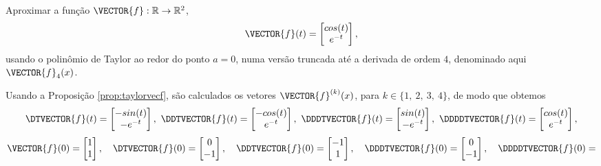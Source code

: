 \begin{example}\label{ex:prop:taylorvecf}
Aproximar a função $\VECTOR{f}:\mathbb{R} \rightarrow \mathbb{R}^{2}$,
\begin{equation}
\VECTOR{f}(t)=
\begin{bmatrix}
cos(t)\\
e^{-t}
\end{bmatrix},
\end{equation}
usando o polinômio de Taylor ao redor do ponto $a=0$,
numa versão truncada até a derivada de ordem $4$,
denominado aqui $\VECTOR{f}_4(x)$.
\end{example}
\begin{SolutionT}
Usando a Proposição \ref{prop:taylorvecf}, são calculados os vetores $\VECTOR{f}^{(k)}(x)$, para $k\in\{1,~ 2,~ 3,~ 4\}$,
de modo que obtemos
\begin{equation}
\DTVECTOR{f}(t)=
\begin{bmatrix}
-sin(t)\\
-e^{-t}
\end{bmatrix},~
\DDTVECTOR{f}(t)=
\begin{bmatrix}
-cos(t)\\
e^{-t}
\end{bmatrix},~
\DDDTVECTOR{f}(t)=
\begin{bmatrix}
sin(t)\\
-e^{-t}
\end{bmatrix},~
\DDDDTVECTOR{f}(t)=
\begin{bmatrix}
cos(t)\\
e^{-t}
\end{bmatrix},
\end{equation}
\begin{equation}
\VECTOR{f}(0)=
\begin{bmatrix}
1\\
1
\end{bmatrix},
\quad
\DTVECTOR{f}(0)=
\begin{bmatrix}
0\\
-1
\end{bmatrix},
\quad
\DDTVECTOR{f}(0)=
\begin{bmatrix}
-1\\
1
\end{bmatrix},
\quad
\DDDTVECTOR{f}(0)=
\begin{bmatrix}
0\\
-1
\end{bmatrix},
\quad
\DDDDTVECTOR{f}(0)=

\end{equation}
\end{SolutionT}
